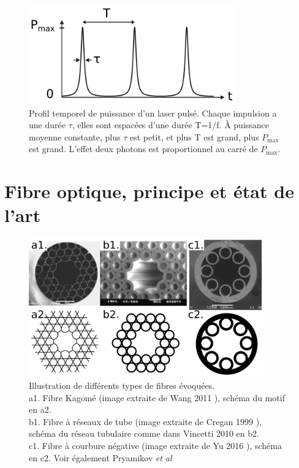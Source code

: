 
\begin{figure}
\centering
\includegraphics[width=0.8\textwidth]{./files/pulsed_laser.svg.png}
\caption{Profil temporel de puissance d'un laser pulsé. Chaque impulsion a une durée $\tau$, elles sont espacées d'une durée T=1/f. À puissance moyenne constante, plus $\tau$ est petit, et plus T est grand, plus $P_\text{max}$ est grand. L'effet deux photons est proportionnel au carré de $P_\text{max}$.
}
\label{pulsed-laser}
\end{figure}


\section{Fibre optique, principe et état de l'art}


\begin{figure}
\centering
\includegraphics[width=0.9\textwidth]{./files/fibers.svg.png}
\caption{Illustration de différents types de fibres évoquées.\\
a1. Fibre Kagomé (image extraite de Wang 2011 \cite{wang_low_2011}), schéma du motif en a2.\\
b1. Fibre à réseaux de tube (image extraite de Cregan 1999 \cite{cregan_single-mode_1999}), schéma du réseau tubulaire comme dans Vincetti 2010 \cite{vincetti_waveguiding_2010} en b2.\\
c1. Fibre à courbure négative (image extraite de Yu 2016 \cite{yu_negative_2016}), schéma en c2. Voir également Pryamikov \emph{et al} \cite{pryamikov_demonstration_2011} \\}
\end{figure}

